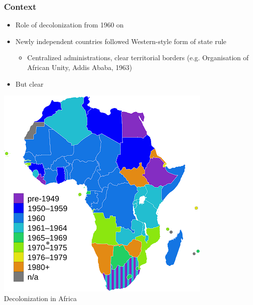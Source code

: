\documentclass[aspectratio=43]{beamer}
\begin{document}
\begin{frame}
\frametitle{Context}
\centering

\begin{minipage}{0.58\textwidth}\centering
\begin{itemize}
  \item Role of decolonization from 1960 on
  \item Newly independent countries followed Western-style form of state rule
  \begin{itemize}
    \item Centralized administrations, clear territorial borders (e.g. Organisation of African Unity, Addis Ababa, 1963)
  \end{itemize}
  \item<2-> But clear 
\end{itemize}
\end{minipage}\hfill
\begin{minipage}{0.4\textwidth}\centering
\includegraphics[width = \textwidth]{img/africa_decolonization}\\
Decolonization in Africa
\end{minipage}

\end{frame}
\end{document}
